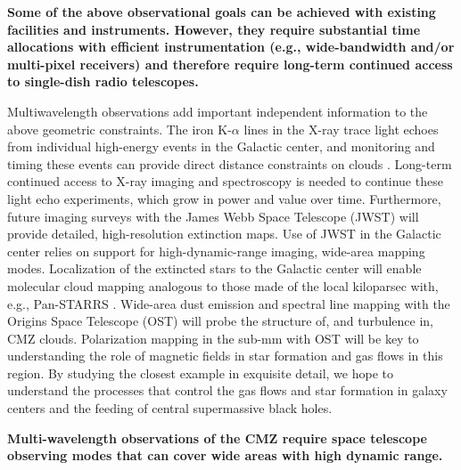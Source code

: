 \documentclass[modern]{aastex62}
\begin{document}
\textbf{
Some of the above observational goals can be achieved with existing facilities
and instruments.  However, they require substantial time allocations with
efficient instrumentation (e.g., wide-bandwidth and/or multi-pixel receivers) and
therefore require long-term continued access to single-dish radio telescopes.
}

Multiwavelength observations add important independent information to the above geometric constraints.
The iron K-$\alpha$ lines in the X-ray trace light echoes from individual
high-energy events in the Galactic center, and monitoring and timing these
events can provide direct distance constraints on clouds
\citep[e.g.,][]{Clavel2014a,Churazov2017b,Churazov2017a,Terrier2018a}.
Long-term continued access to X-ray imaging and spectroscopy is needed to
continue these light echo experiments, which grow in power and value over time.
Furthermore, future imaging surveys with the James Webb Space Telescope (JWST) will provide
detailed, high-resolution extinction maps.  Use of JWST in the Galactic center
relies on support for high-dynamic-range imaging, wide-area mapping modes.
Localization of the extincted stars to the Galactic center will enable
molecular cloud mapping analogous to those made of the local kiloparsec with,
e.g., Pan-STARRS \citep{Green2015b}.  Wide-area dust emission and spectral line
mapping with the Origins Space Telescope (OST) will probe the structure of, and turbulence in, CMZ clouds.
Polarization mapping in the sub-mm with OST will be key to understanding the
role of magnetic fields in star formation and gas flows in this region.
By studying the closest example in exquisite detail, we hope to understand the
processes that control the gas flows and star formation in galaxy centers and
the feeding of central supermassive black holes.

\textbf{Multi-wavelength observations of the CMZ require space telescope
observing modes that can cover wide areas with high dynamic range.}
\end{document}
